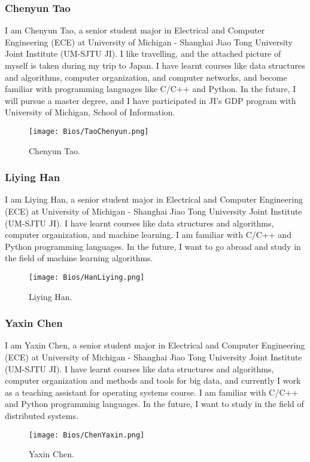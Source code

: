 \documentclass[11pt,a4paper]{article}
\begin{document}
\begin{onehalfspace}
\subsubsection{Chenyun Tao}
I am Chenyun Tao, a senior student major in Electrical and Computer Engineering (ECE) at University of Michigan - Shanghai Jiao Tong University Joint Institute (UM-SJTU JI). I like travelling, and the attached picture of myself is taken during my trip to Japan. I have learnt courses like data structures and algorithms, computer organization, and computer networks, and become familiar with programming languages like C/C++ and Python. In the future, I will pursue a master degree, and I have participated in JI's GDP program with University of Michigan, School of Information.
\begin{figure}[H]
	\centering
	\texttt{[image: Bios/TaoChenyun.png]}
	\caption{Chenyun Tao.}
\end{figure} 
\subsubsection{Liying Han}
I am Liying Han, a senior student major in Electrical and Computer Engineering (ECE) at University of Michigan - Shanghai Jiao Tong University Joint Institute (UM-SJTU JI). I have learnt courses like data structures and algorithms, computer organization, and machine learning. I am familiar with C/C++ and Python programming languages. In the future, I want to go abroad and study in the field of machine learning algorithms.
\begin{figure}[H]
	\centering
	\texttt{[image: Bios/HanLiying.png]}
	\caption{Liying Han.}
\end{figure} 
\subsubsection{Yaxin Chen}
I am Yaxin Chen, a senior student major in Electrical and Computer Engineering (ECE) at University of Michigan - Shanghai Jiao Tong University Joint Institute (UM-SJTU JI). I have learnt courses like data structures and algorithms, computer organization and methods and tools for big data, and currently I work as a teaching assistant for operating systems course. I am familiar with C/C++ and Python programming languages. In the future, I want to study in the field of distributed systems.
\begin{figure}[H]
	\centering
	\texttt{[image: Bios/ChenYaxin.png]}
	\caption{Yaxin Chen.}
\end{figure} 





\end{onehalfspace}
\end{document}
